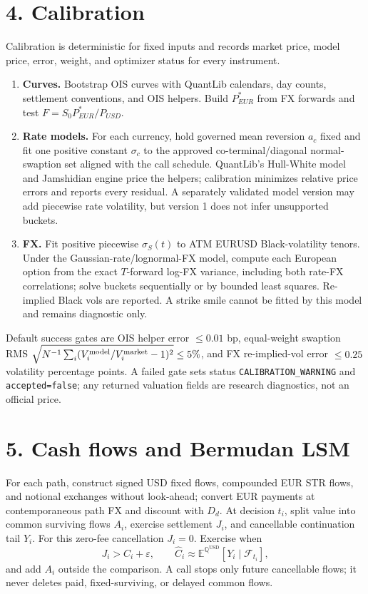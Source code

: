 \documentclass[9pt,letterpaper]{extarticle}
\newcommand{\Qd}{\mathbb{Q}^{\mathrm{USD}}}
\newcommand{\E}{\mathbb{E}}
\begin{document}
\section{4. Calibration}

Calibration is deterministic for fixed inputs and records market price, model price, error, weight, and optimizer status for every instrument.

\begin{enumerate}
 \item \textbf{Curves.} Bootstrap OIS curves with QuantLib calendars, day counts, settlement conventions, and OIS helpers. Build $P_{EUR}^{*}$ from FX forwards and test $F=S_0P_{EUR}^{*}/P_{USD}$.
 \item \textbf{Rate models.} For each currency, hold governed mean reversion $a_c$ fixed and fit one positive constant $\sigma_c$ to the approved co-terminal/diagonal normal-swaption set aligned with the call schedule. QuantLib's Hull-White model and Jamshidian engine price the helpers; calibration minimizes relative price errors and reports every residual. A separately validated model version may add piecewise rate volatility, but version 1 does not infer unsupported buckets.
 \item \textbf{FX.} Fit positive piecewise $\sigma_S(t)$ to ATM EURUSD Black-volatility tenors. Under the Gaussian-rate/lognormal-FX model, compute each European option from the exact $T$-forward log-FX variance, including both rate-FX correlations; solve buckets sequentially or by bounded least squares. Re-implied Black vols are reported. A strike smile cannot be fitted by this model and remains diagnostic only.
\end{enumerate}

Default success gates are OIS helper error $\leq0.01$ bp, equal-weight swaption RMS $\sqrt{N^{-1}\sum_i(V_i^{\rm model}/V_i^{\rm market}-1)^2}\leq5\%$, and FX re-implied-vol error $\leq0.25$ volatility percentage points. A failed gate sets status \texttt{CALIBRATION\_WARNING} and \texttt{accepted=false}; any returned valuation fields are research diagnostics, not an official price.

\newpage
\section{5. Cash flows and Bermudan LSM}

For each path, construct signed USD fixed flows, compounded EUR \texteuro STR flows, and notional exchanges without look-ahead; convert EUR payments at contemporaneous path FX and discount with $D_d$. At decision $t_i$, split value into common surviving flows $A_i$, exercise settlement $J_i$, and cancellable continuation tail $Y_i$. For this zero-fee cancellation $J_i=0$. Exercise when
\[
 J_i>\widehat C_i+\varepsilon,\qquad
 \widehat C_i\approx\E^{\Qd}[Y_i\mid\mathcal F_{t_i}],
\]
and add $A_i$ outside the comparison. A call stops only future cancellable flows; it never deletes paid, fixed-surviving, or delayed common flows.
\end{document}
